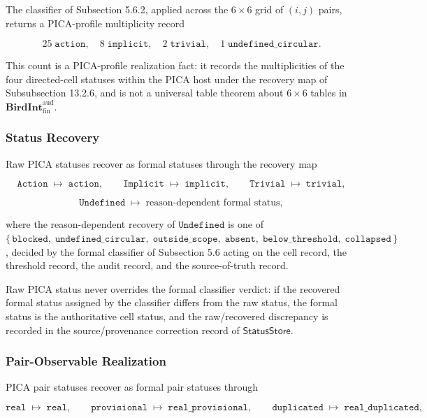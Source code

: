 \documentclass[11pt]{article}
\theoremstyle{definition}
\begin{document}
The classifier of Subsection 5.6.2, applied across the \(6\times 6\) grid of \((i,j)\) pairs, returns a PICA-profile multiplicity record

\[
25\;\texttt{action},\quad 8\;\texttt{implicit},\quad 2\;\texttt{trivial},\quad 1\;\texttt{undefined\_circular}.
\]

This count is a PICA-profile realization fact: it records the multiplicities of the four directed-cell statuses within the PICA host under the recovery map of Subsubsection 13.2.6, and is not a universal table theorem about \(6\times 6\) tables in \(\mathbf{BirdInt}^{\mathrm{aud}}_{\mathrm{fin}}\).

\subsubsection{Status Recovery}

Raw PICA statuses recover as formal statuses through the recovery map

\[
\texttt{Action}\;\longmapsto\;\texttt{action},\qquad\texttt{Implicit}\;\longmapsto\;\texttt{implicit},\qquad\texttt{Trivial}\;\longmapsto\;\texttt{trivial},
\]

\[
\texttt{Undefined}\;\longmapsto\;\text{reason-dependent formal status},
\]

where the reason-dependent recovery of \(\texttt{Undefined}\) is one of \(\{\,\texttt{blocked},\;\texttt{undefined\_circular},\;\texttt{outside\_scope},\;\texttt{absent},\;\texttt{below\_threshold},\;\texttt{collapsed}\,\}\), decided by the formal classifier of Subsection 5.6 acting on the cell record, the threshold record, the audit record, and the source-of-truth record.

Raw PICA status never overrides the formal classifier verdict: if the recovered formal status assigned by the classifier differs from the raw status, the formal status is the authoritative cell status, and the raw/recovered discrepancy is recorded in the source/provenance correction record of \(\mathsf{StatusStore}\).

\subsubsection{Pair-Observable Realization}

PICA pair statuses recover as formal pair statuses through

\[
\texttt{real}\;\longmapsto\;\texttt{real},\qquad\texttt{provisional}\;\longmapsto\;\texttt{real\_provisional},\qquad\texttt{duplicated}\;\longmapsto\;\texttt{real\_duplicated},
\]
\end{document}
